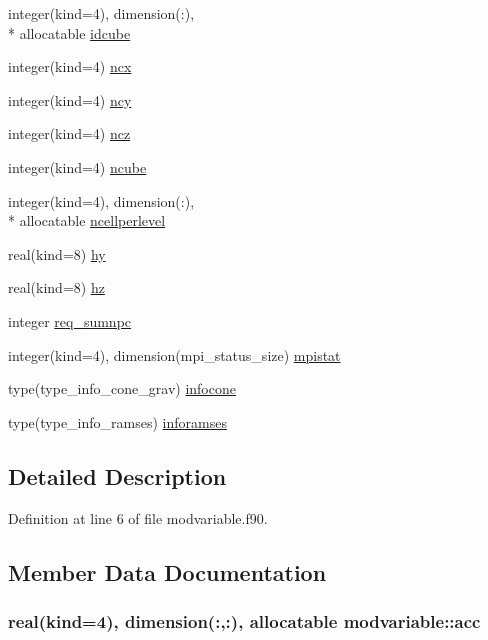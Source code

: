 \begin{DoxyCompactItemize}
integer(kind=4), dimension(\-:), \\*
allocatable \hyperlink{classmodvariable_a3d2c992bfc80529f8019708135b526c1}{idcube}
\item 
integer(kind=4) \hyperlink{classmodvariable_af74891a7a77b7407b68129d1e9778f21}{ncx}
\item 
integer(kind=4) \hyperlink{classmodvariable_ac9a317ff189f6a3f0bac9df49e622027}{ncy}
\item 
integer(kind=4) \hyperlink{classmodvariable_ad8d90278c9709b9db15059e8c320feb4}{ncz}
\item 
integer(kind=4) \hyperlink{classmodvariable_a718efb76ffcda6b833e85642669fd01e}{ncube}
\item 
integer(kind=4), dimension(\-:), \\*
allocatable \hyperlink{classmodvariable_ab27c6baa1a2f6fe45974edb46a27bd93}{ncellperlevel}
\item 
real(kind=8) \hyperlink{classmodvariable_a56edfdc4b391ae52b9bcce691c5119d5}{hy}
\item 
real(kind=8) \hyperlink{classmodvariable_a40a10b2561275758f13b237235540ea9}{hz}
\item 
integer \hyperlink{classmodvariable_adfc8585ffcde6504507af946c0afbea8}{req\-\_\-sumnpc}
\item 
integer(kind=4), dimension(mpi\-\_\-status\-\_\-size) \hyperlink{classmodvariable_a9d7821389828ef466b9e1fcffd62dd76}{mpistat}
\item 
type(type\-\_\-info\-\_\-cone\-\_\-grav) \hyperlink{classmodvariable_a90367aa0c8f20c16f78784752cc09de7}{infocone}
\item 
type(type\-\_\-info\-\_\-ramses) \hyperlink{classmodvariable_a9da60aa446a9c549bfd44c1e4ef5a6cb}{inforamses}
\end{DoxyCompactItemize}


\subsection{Detailed Description}


Definition at line 6 of file modvariable.\-f90.



\subsection{Member Data Documentation}
\hypertarget{classmodvariable_a3d403cfbb8c3f6373447b1e6647d7aa7}{
\subsubsection[{acc}]{\setlength{\rightskip}{0pt plus 5cm}real(kind=4), dimension(\-:,\-:), allocatable modvariable\-::acc}}\label{classmodvariable_a3d403cfbb8c3f6373447b1e6647d7aa7}


